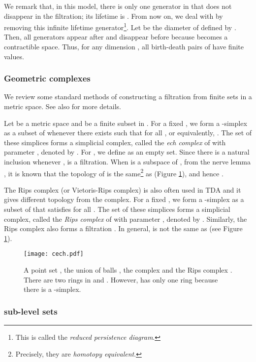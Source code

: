 \documentclass{article}
\begin{document}
We remark that, in this model, there is only one generator in  that does not disappear in the filtration; its lifetime is .
From now on, we deal with  by removing this infinite lifetime generator\footnote{This is called the {\em reduced persistence diagram}.}.
Let  be the diameter of  defined by .
Then, all generators appear after  and disappear before  because  becomes a contractible space.
Thus, for any dimension , all birth-death pairs of  have finite values.


\subsubsection{Geometric complexes}

We review some standard methods of constructing a filtration from finite sets in a metric space. See also \cite{CdSO14} for more details.

Let  be a metric space and  be a finite subset in .
For a fixed , we form a -simplex  as a subset  of  whenever there exists  such that  for all , or equivalently, .
The set of these simplices forms a simplicial complex, called the {\em ech complex} of  with parameter , denoted by .
For , we define  as an empty set.
Since there is a natural inclusion  whenever ,  is a filtration.
When  is a subspace of , from the nerve lemma \cite{Ha02}, it is known that the topology of  is the same\footnote{Precisely, they are {\em homotopy equivalent}.} as  (Figure \ref{fig:cech}), and hence .

The Rips complex (or Vietoris-Rips complex) is also often used in TDA and it gives different topology from the  complex.
For a fixed , we form a -simplex  as a subset  of  that satisfies  for all .
The set of these simplices forms a simplicial complex, called the {\em Rips complex} of  with parameter , denoted by .
Similarly, the Rips complex also forms a filtration .
In general,  is not the same as  (see Figure \ref{fig:cech}).

\begin{figure}[htbp]
\begin{center}
\texttt{[image: cech.pdf]}
\end{center}
\caption{A point set , the union of balls , the  complex  and the Rips complex . There are two rings in  and . However,  has only one ring because there is a -simplex.}
\label{fig:cech}
\end{figure}


\subsubsection{sub-level sets}
\end{document}
